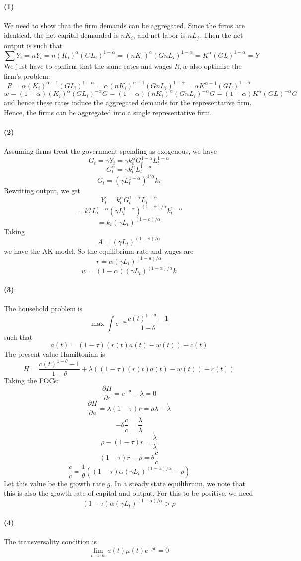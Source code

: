 \documentclass[10pt,letter]{article}
\newcommand{\problempart}[1]{\paragraph{#1}}
\begin{document}
\problempart{(1)}
We need to show that the firm demands can be aggregated. Since the firms are identical, the net capital demanded is $nK_i$, and net labor is $nL_j$. Then the net output is such that
\[ \sum Y_i = nY_i = n(K_i)^\alpha(GL_i)^{1-\alpha} = (nK_i)^\alpha(GnL_i)^{1-\alpha} = K^\alpha (GL)^{1-\alpha} = Y \]
We just have to confirm that the same rates and wages $R, w$ also optimize the firm's problem:
\[ R = \alpha (K_i)^{\alpha - 1}(GL_i)^{1-\alpha} = \alpha (nK_i)^{\alpha - 1}(GnL_i)^{1-\alpha} = \alpha K^{\alpha - 1}(GL)^{1-\alpha}\]
\[ w = (1-\alpha) (K_i)^{\alpha}(GL_i)^{-\alpha}G = (1-\alpha) (nK_i)^{\alpha}(GnL_i)^{-\alpha}G= (1-\alpha) K^{\alpha}(GL)^{-\alpha}G\]
and hence these rates induce the aggregated demands for the representative firm. Hence, the firms can be aggregated into a single representative firm.
\problempart{(2)}
Assuming firms treat the government spending as exogenous, we have
\[ G_t = \gamma Y_t = \gamma k_t^\alpha G_t^{1-\alpha} L_t^{1-\alpha} \]
\[ G_t ^\alpha = \gamma k_t^\alpha L_t^{1-\alpha} \]
\[ G_t = (\gamma L_t^{1-\alpha})^{1/\alpha} k_t \]
Rewriting output, we get
\[ Y_t =k_t^\alpha G_t^{1-\alpha} L_t^{1-\alpha} \]\[=  k_t^\alpha L_t^{1-\alpha} (\gamma L_t^{1-\alpha})^{(1-\alpha)/\alpha} k_t^{1-\alpha} \]
\[ = k_t (\gamma L_t)^{(1-\alpha)/\alpha} \]
Taking \[ A = (\gamma L_t)^{(1-\alpha)/\alpha} \]
we have the AK model.
So the equilibrium rate and wages are
\[ r = \alpha (\gamma L_t)^{(1-\alpha)/\alpha} \]
\[ w = (1-\alpha) (\gamma L_t)^{(1-\alpha)/\alpha} k \]
\problempart{(3)}
The household problem is
\[ \max \int e^{-\rho t} \frac{c(t)^{1-\theta} - 1}{1-\theta} \]
such that
\[ \dot{a}(t) = (1-\tau)(r(t)a(t) - w(t)) - c(t) \]
The present value Hamiltonian is
\[ H =\frac{c(t)^{1-\theta} - 1}{1-\theta} + \lambda ((1-\tau)(r(t)a(t) - w(t)) - c(t)) \]
Taking the FOCs:
\[ \frac{\partial H}{\partial c} = c^{-\theta} - \lambda = 0 \]
\[ \frac{\partial H}{\partial a} = \lambda(1-\tau)r = \rho \lambda - \dot{\lambda} \]
\[ -\theta \frac{\dot{c}}{c} = \frac{\dot{\lambda}}{\lambda} \]
\[ \rho - (1-\tau)r = \frac{\dot{\lambda}}{\lambda}  \]
\[ (1-\tau)r - \rho = \theta \frac{\dot{c}}{c}  \]
\[  \frac{\dot{c}}{c} = \frac{1}{\theta}\left((1-\tau)\alpha (\gamma L_t)^{(1-\alpha)/\alpha} - \rho \right) \]
Let this value be the growth rate $g$.
In a steady state equilibrium, we note that this is also the growth rate of capital and output. For this to be positive, we need
\[ (1-\tau)\alpha (\gamma L_t)^{(1-\alpha)/\alpha} > \rho \]
\problempart{(4)}
The transversality condition is
\[ \lim_{t\to\infty} a(t) \mu(t) e^{-\rho t} = 0 \]
\end{document}
